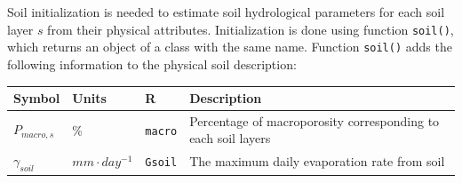 \documentclass[]{book}
\begin{document}
Soil initialization is needed to estimate soil hydrological parameters
for each soil layer \(s\) from their physical attributes. Initialization
is done using function \texttt{soil()}, which returns an object of a
class with the same name. Function \texttt{soil()} adds the following
information to the physical soil description:

\begin{longtable}[]{@{}llll@{}}
\toprule
\begin{minipage}[b]{0.11\columnwidth}\raggedright\strut
Symbol\strut
\end{minipage} & \begin{minipage}[b]{0.10\columnwidth}\raggedright\strut
Units\strut
\end{minipage} & \begin{minipage}[b]{0.06\columnwidth}\raggedright\strut
R\strut
\end{minipage} & \begin{minipage}[b]{0.53\columnwidth}\raggedright\strut
Description\strut
\end{minipage}\tabularnewline
\midrule
\endhead
\begin{minipage}[t]{0.11\columnwidth}\raggedright\strut
\(P_{macro, s}\)\strut
\end{minipage} & \begin{minipage}[t]{0.10\columnwidth}\raggedright\strut
\%\strut
\end{minipage} & \begin{minipage}[t]{0.06\columnwidth}\raggedright\strut
\texttt{macro}\strut
\end{minipage} & \begin{minipage}[t]{0.53\columnwidth}\raggedright\strut
Percentage of macroporosity corresponding to each soil layers\strut
\end{minipage}\tabularnewline
\begin{minipage}[t]{0.11\columnwidth}\raggedright\strut
\(\gamma_{soil}\)\strut
\end{minipage} & \begin{minipage}[t]{0.10\columnwidth}\raggedright\strut
\(mm \cdot day^{-1}\)\strut
\end{minipage} & \begin{minipage}[t]{0.06\columnwidth}\raggedright\strut
\texttt{Gsoil}\strut
\end{minipage} & \begin{minipage}[t]{0.53\columnwidth}\raggedright\strut
The maximum daily evaporation rate from soil\strut
\end{minipage}\tabularnewline

\end{longtable}
\end{document}
